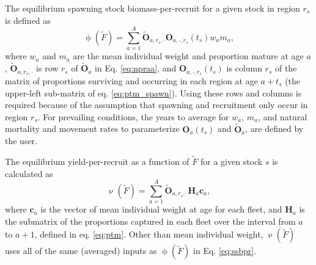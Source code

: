 \documentclass[
]{article}
\begin{document}
The equilibrium spawning stock biomass-per-recruit for a given stock in region \(r_s\) is defined as
\begin{equation}\label{eq:ssbpr}
 \upphi(\widetilde{F}) = \sum^{A}_{a=1} \widetilde{\mathbf{O}}_{a,r_s,\cdot} \mathbf{O}_{a,\cdot,r_s}(t_s) w_{a} m_{a},
\end{equation}
where \(w_{a}\) and \(m_{a}\) are the mean individual weight and proportion mature at age \(a\), \(\widetilde{\mathbf{O}}_{a,r_s,\cdot}\) is row \(r_s\) of \(\widetilde{\mathbf{O}}_a\) in Eq. \ref{eq:npraa}, and \(\mathbf{O}_{a,\cdot,r_s}(t_s)\) is column \(r_s\) of the matrix of proportions surviving and occurring in each region at age \(a+t_s\) (the upper-left sub-matrix of eq. \ref{eq:ptm_spawn}). Using these rows and columns is required because of the assumption that spawning and recruitment only occur in region \(r_s\). For prevailing conditions, the years to average for \(w_a\), \(m_a\), and natural mortality and movement rates to parameterize \(\mathbf{O}_{a}(t_s)\) and \(\widetilde{\mathbf{O}}_{a}\), are defined by the user.

The equilibrium yield-per-recruit as a function of \(\widetilde{F}\) for a given stock \(s\) is calculated as
\begin{equation}\label{eq:ypr}
 \upnu({\widetilde{F}}) = \sum^{A}_{a=1} \widetilde{\mathbf{O}}_{a,r_s,\cdot} \mathbf{H}_{a} \mathbf{c}_{a},
\end{equation}
where \(\mathbf{c}_{a}\) is the vector of mean individual weight at age for each fleet, and \(\mathbf{H}_{a}\) is the submatrix of the proportions captured in each fleet over the interval from \(a\) to \(a+1\), defined in eq. \ref{eq:ptm}. Other than mean individual weight, \(\upnu({\widetilde{F}})\) uses all of the same (averaged) inputs as \(\upphi({\widetilde{F}})\) in Eq. \ref{eq:ssbpr}.
\end{document}
